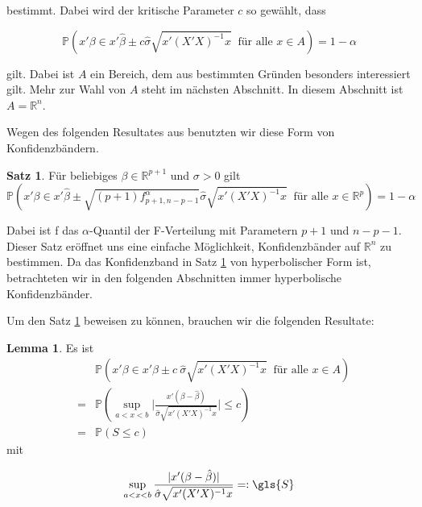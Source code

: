 \documentclass[12pt,a4paper]{article}
\theoremstyle{definition}
\theoremstyle{definition}
\newtheorem{Satz}[Definition]{Satz}
\theoremstyle{definition}
\theoremstyle{definition}
\newtheorem{Lemma}[Definition]{Lemma}
\begin{document}
bestimmt. Dabei wird der kritische Parameter $c$ so gewählt, dass 

\begin{equation*}
\mathbb{P}(x' \beta \in x'\hat{\beta} \pm c \hat{\sigma}\sqrt{x'(X'X)^{-1}x} ~ \text{ für alle } x \in A)=1-\alpha
\end{equation*}

gilt. Dabei ist $A$ ein Bereich, dem aus bestimmten Gründen besonders interessiert gilt. Mehr zur Wahl von $A$ steht im nächsten Abschnitt. In diesem Abschnitt ist $A = \mathbb{R}^n$.

Wegen des folgenden Resultates aus \cite[66]{Liu64} benutzten wir diese Form von Konfidenzbändern.

\begin{Satz} \label{KB_Eigenschaft}
Für beliebiges $\beta \in \mathbb{R}^{p+1}$ und $\sigma > 0$ gilt 
\begin{equation*}
\mathbb{P}( x'\beta \in x' \hat{\beta} \pm \sqrt{(p+1) f^{\alpha}_{p+1,n-p-1}} \hat{\sigma} \sqrt{x' (X'X)^{-1}x} ~ \text{ für alle } x \in \mathbb{R}^p) = 1 - \alpha
\end{equation*}
\end{Satz} 

Dabei ist \gls{f} das $\alpha$-Quantil der F-Verteilung mit Parametern $p+1$ und $n-p-1$. Dieser Satz eröffnet uns eine einfache Möglichkeit, Konfidenzbänder auf $\mathbb{R}^n$ zu bestimmen. Da das Konfidenzband in Satz \ref{KB_Eigenschaft} von hyperbolischer Form ist, betrachteten wir in den folgenden Abschnitten immer hyperbolische Konfidenzbänder.

Um den Satz \ref{KB_Eigenschaft} beweisen zu können, brauchen wir die folgenden Resultate:

\begin{Lemma} \label{Basiseigenschaft}
Es ist
\begin{eqnarray*}
&&\mathbb{P}( x'\beta \in x' \hat{\beta} \pm c ~ \hat{\sigma} \sqrt{x' (X'X)^{-1} x} ~ \text{ für alle } x \in A ) \\
&=& \mathbb{P}( \sup_{a<x<b} \bigg \vert \frac{x'(\beta - \hat{\beta})}{\hat{\sigma} \sqrt{x'(X'X)^{-1}x}} \bigg \vert \leq c) \\
&=& \mathbb{P}( S \leq c)
\end{eqnarray*}
mit 

\begin{equation*}
\sup_{a<x<b} \frac{\vert x'(\beta - \hat{\beta}) \vert}{\hat{\sigma} \sqrt{x'(X'X)^{-1}x}}  =:  \gls{S}
\end{equation*}

\end{Lemma}
\end{document}
